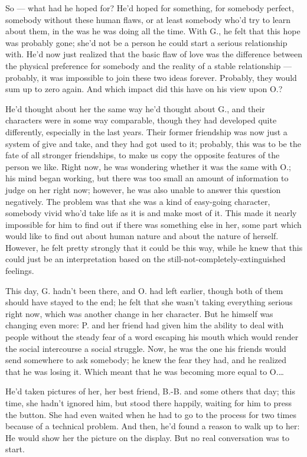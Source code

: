 So --- what had he hoped for? He'd hoped for something, for somebody perfect, somebody without these human flaws, or at least somebody who'd try to learn about them, in the was he was doing all the time. With G., he felt that this hope was probably gone; she'd not be a person he could start a serious relationship with. He'd now just realized that the basic flaw of love was the difference between the physical preference for somebody and the reality of a stable relationship --- probably, it was impossible to join these two ideas forever. Probably, they would sum up to zero again.
And which impact did this have on his view upon O.?

He'd thought about her the same way he'd thought about G., and their characters were in some way comparable, though they had developed quite differently, especially in the last years. Their former friendship was now just a system of give and take, and they had got used to it; probably, this was to be the fate of all stronger friendships, to make us copy the opposite features of the person we like. Right now, he was wondering whether it was the same with O.; his mind began working, but there was too small an amount of information to judge on her right now; however, he was also unable to answer this question negatively. The problem was that she was a kind of easy-going character, somebody vivid who'd take life as it is and make most of it. This made it nearly impossible for him to find out if there was something else in her, some part which would like to find out about human nature and about the nature of herself. However, he felt pretty strongly that it could be this way, while he knew that this could just be an interpretation based on the still-not-completely-extinguished feelings.

This day, G. hadn't been there, and O. had left earlier, though both of them should have stayed to the end; he felt that she wasn't taking everything serious right now, which was another change in her character. But he himself was changing even more: P. and her friend had given him the ability to deal with people without the steady fear of a word escaping his mouth which would render the social intercourse a social struggle. Now, he was the one his friends would send somewhere to ask somebody; he knew the fear they had, and he realized that he was losing it. Which meant that he was becoming more equal to O.\dots{}

He'd taken pictures of her, her best friend, B.-B. and some others that day; this time, she hadn't ignored him, but stood there happily, waiting for him to press the button. She had even waited when he had to go to the process for two times because of a technical problem. And then, he'd found a reason to walk up to her: He would show her the picture on the display. But no real conversation was to start.

